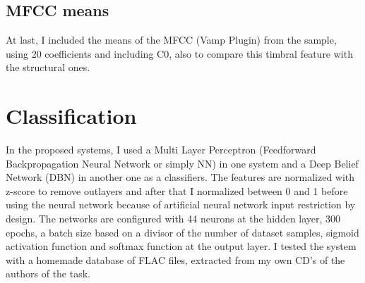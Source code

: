 \documentclass[a4paper,openany,oneside,12pt]{book}
\begin{document}
\subsection{MFCC means}\label{subsec:mfcc_means}
At last, I included the means of the MFCC (Vamp Plugin) from the sample, using 20 coefficients and including C0, also to compare this timbral feature with the structural ones.


\section{Classification}\label{sec:classification}
In the proposed systems, I used a Multi Layer Perceptron (Feedforward Backpropagation Neural Network or simply NN) in one system and a Deep Belief Network (DBN) in another one as a classifiers. The features are normalized with z-score to remove outlayers and after that I normalized between 0 and 1 before using the neural network because of artificial neural network input restriction by design. The networks are configured with 44 neurons at the hidden layer, 300 epochs, a batch size based on a divisor of the number of dataset samples, sigmoid activation function and softmax function at the output layer. I tested the system with a homemade database of FLAC files, extracted from my own CD's of the authors of the task.
\end{document}
